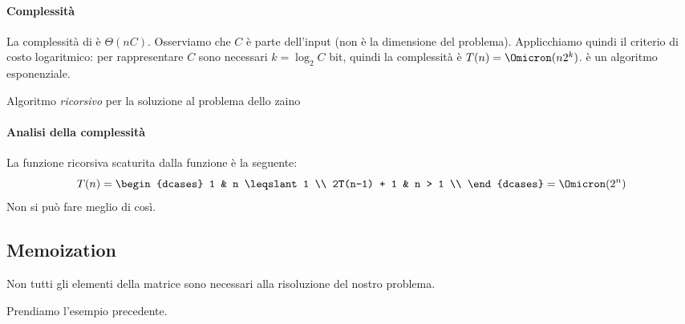 \paragraph{Complessità}
La complessità di \knapsack è \(\Theta(nC)\).
Osserviamo che \(C\) è parte dell'input (non è la dimensione del problema).
Applicchiamo quindi il criterio di costo logaritmico: per rappresentare \(C\) sono necessari \(k = \log_2 C\) bit, quindi la complessità è \(T(n) = \Omicron(n2^k)\). \knapsack è un algoritmo esponenziale.

\begin{algorithm}[H]
    \caption{Algoritmo \emph{ricorsivo} per la soluzione al problema dello zaino}
    
\end{algorithm}

\paragraph{Analisi della complessità}
La funzione ricorsiva scaturita dalla funzione \knapsack è la seguente:
\[
    T(n) =
    \begin{dcases}
        1           & n \leqslant 1 \\
        2T(n-1) + 1 & n > 1         \\
    \end{dcases}
    = \Omicron(2^n)
\]
Non si può fare meglio di così.

\subsection{Memoization}

\begin{note}
Non tutti gli elementi della matrice sono necessari alla risoluzione del nostro problema.
\end{note}

Prendiamo l'esempio precedente.


